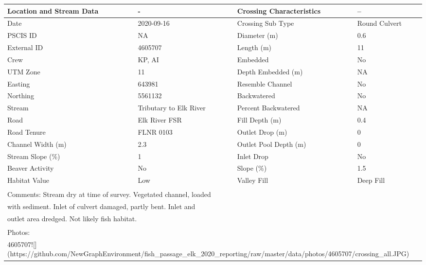 \documentclass[
]{book}
\begin{document}
\begin{tabular}{l|l|l|l}
\hline
Location and Stream Data & - & Crossing Characteristics & --\\
\hline
Date & 2020-09-16 & Crossing Sub Type & Round Culvert\\
\hline
PSCIS ID & NA & Diameter (m) & 0.6\\
\hline
External ID & 4605707 & Length (m) & 11\\
\hline
Crew & KP, AI & Embedded & No\\
\hline
UTM Zone & 11 & Depth Embedded (m) & NA\\
\hline
Easting & 643981 & Resemble Channel & No\\
\hline
Northing & 5561132 & Backwatered & No\\
\hline
Stream & Tributary to Elk River & Percent Backwatered & NA\\
\hline
Road & Elk River FSR & Fill Depth (m) & 0.4\\
\hline
Road Tenure & FLNR 0103 & Outlet Drop (m) & 0\\
\hline
Channel Width (m) & 2.3 & Outlet Pool Depth (m) & 0\\
\hline
Stream Slope (\%) & 1 & Inlet Drop & No\\
\hline
Beaver Activity & No & Slope (\%) & 1.5\\
\hline
Habitat Value & Low & Valley Fill & Deep Fill\\
\hline
\multicolumn{4}{l}{\textsuperscript{} Comments: Stream dry at time of survey. Vegetated channel, loaded}\\
\multicolumn{4}{l}{with sediment. Inlet of culvert damaged, partly bent. Inlet and}\\
\multicolumn{4}{l}{outlet area dredged. Not likely fish habitat.}\\
\multicolumn{4}{l}{\textsuperscript{} Photos:}\\
\multicolumn{4}{l}{4605707![](https://github.com/NewGraphEnvironment/fish\_passage\_elk\_2020\_reporting/raw/master/data/photos/4605707/crossing\_all.JPG)}\\
\end{tabular}
\end{document}
